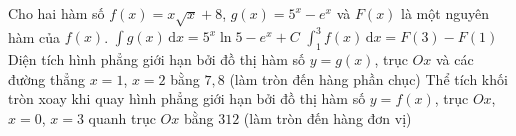 \begin{ex}%
	 Cho hai hàm số $f(x) = x\sqrt{x} + 8$, $g(x) = 5^x - e^x$ và $F(x)$ là một nguyên hàm của $f(x)$.
	 \choiceTF
		{$\displaystyle \int  g\left( x \right)\,\mathrm{d}x = 5^x \ln 5 - e^x + C$}
		{\True $\displaystyle \int_{1}^{3} f\left( x \right)\,\mathrm{d}x = F\left( 3 \right) - F\left( 1  \right)$}
		{\True Diện tích hình phẳng giới  hạn bởi đồ thị hàm số $y = g\left( x \right)$, trục $Ox$ và các đường thẳng $x = 1$, $x = 2$ bằng $7{,}8$ (làm tròn đến hàng phần chục)}
		{Thể tích khối tròn xoay khi quay hình phẳng giới hạn bởi đồ thị hàm số $y = f(x)$, trục $Ox$, $x = 0$, $x = 3$ quanh trục $Ox$ bằng $312$ (làm tròn đến hàng đơn vị)} 
\end{ex}

